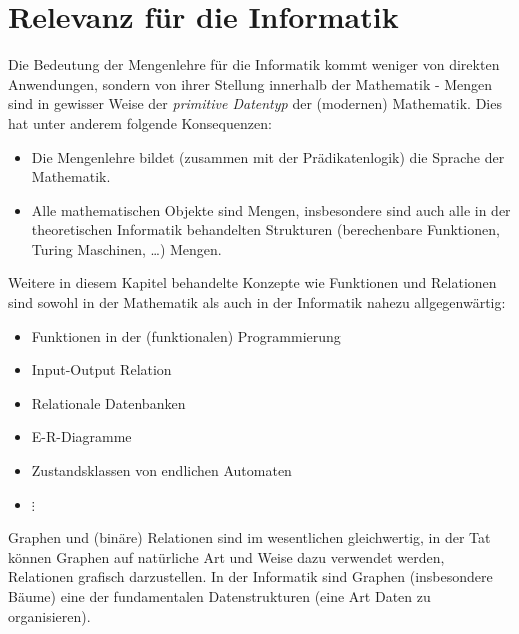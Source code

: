 \section*{Relevanz für die Informatik}
Die Bedeutung der Mengenlehre für die Informatik kommt weniger von direkten Anwendungen, sondern von ihrer Stellung innerhalb der Mathematik - Mengen sind in gewisser Weise der \textit{primitive Datentyp} der (modernen) Mathematik. Dies hat unter anderem folgende Konsequenzen:
\begin{itemize}
\item Die Mengenlehre bildet (zusammen mit der Prädikatenlogik) die Sprache der Mathematik.
\item Alle mathematischen Objekte sind Mengen, insbesondere sind auch alle in der theoretischen Informatik behandelten Strukturen (berechenbare Funktionen, Turing Maschinen, \dots) Mengen.
\end{itemize}
Weitere in diesem Kapitel behandelte Konzepte wie Funktionen und Relationen sind sowohl in der Mathematik als auch in der Informatik nahezu allgegenwärtig:
\begin{itemize}
\item Funktionen in der (funktionalen) Programmierung
\item Input-Output Relation
\item Relationale Datenbanken
\item E-R-Diagramme
\item Zustandsklassen von endlichen Automaten
\item $\vdots$
\end{itemize}
Graphen und (binäre) Relationen sind im wesentlichen gleichwertig, in der Tat können
Graphen auf natürliche Art und Weise dazu verwendet werden, Relationen grafisch
darzustellen. In der Informatik sind Graphen (insbesondere Bäume) eine der
fundamentalen Datenstrukturen (eine Art Daten zu organisieren).



